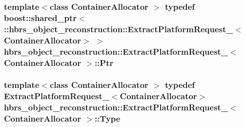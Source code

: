 \hypertarget{structhbrs__object__reconstruction_1_1_extract_platform_request___acc9d0c8b4a454a52f50082f6d5cca948}{
\subsubsection[{\-Ptr}]{\setlength{\rightskip}{0pt plus 5cm}template$<$class Container\-Allocator $>$ typedef boost\-::shared\-\_\-ptr$<$ \-::{\bf hbrs\-\_\-object\-\_\-reconstruction\-::\-Extract\-Platform\-Request\-\_\-}$<$\-Container\-Allocator$>$ $>$ {\bf hbrs\-\_\-object\-\_\-reconstruction\-::\-Extract\-Platform\-Request\-\_\-}$<$ \-Container\-Allocator $>$\-::{\bf \-Ptr}}}\label{structhbrs__object__reconstruction_1_1_extract_platform_request___acc9d0c8b4a454a52f50082f6d5cca948}
\hypertarget{structhbrs__object__reconstruction_1_1_extract_platform_request___aa0aac3252314b85c5f8de66313a3144a}{
\subsubsection[{\-Type}]{\setlength{\rightskip}{0pt plus 5cm}template$<$class Container\-Allocator $>$ typedef {\bf \-Extract\-Platform\-Request\-\_\-}$<$\-Container\-Allocator$>$ {\bf hbrs\-\_\-object\-\_\-reconstruction\-::\-Extract\-Platform\-Request\-\_\-}$<$ \-Container\-Allocator $>$\-::{\bf \-Type}}}\label{structhbrs__object__reconstruction_1_1_extract_platform_request___aa0aac3252314b85c5f8de66313a3144a}


